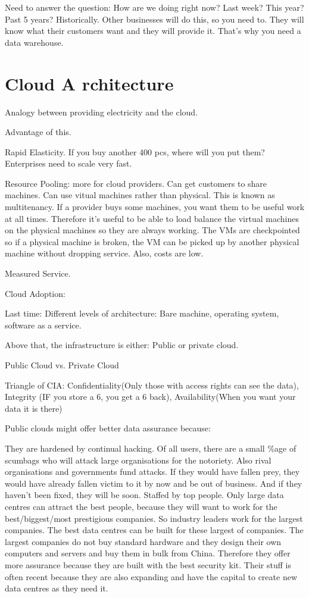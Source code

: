 \documentclass[11pt]{article}
\begin{document}
Need to answer the question: How are we doing right now? Last week? This year? Past 5 years? Historically. Other businesses will do this, so you need to. They will know what their customers want and they will provide it. That’s why you need a data warehouse.



\section{Cloud A rchitecture}

Analogy between providing electricity and the cloud.

Advantage of this.

Rapid Elasticity. If you buy another 400 pcs, where will you put them? Enterprises need to scale very fast.

Resource Pooling: more for cloud providers. Can get customers to share machines. Can use vitual machines rather than physical. This is known as multitenancy. If a provider buys some machines, you want them to be useful work at all times. Therefore it’s useful to be able to load balance the virtual machines on the physical machines so they are always working. The VMs are checkpointed so if a physical machine is broken, the VM can be picked up by another physical machine without dropping service. Also, costs are low.

Measured Service.

Cloud Adoption:

Last time: Different levels of architecture: Bare machine, operating system, software as a service.

Above that, the infrastructure is either: Public or private cloud.

Public Cloud vs. Private Cloud

Triangle of CIA: Confidentiality(Only those with access rights can see the data), Integrity (IF you store a 6, you get a 6 back), Availability(When you want your data it is there)

Public clouds might offer better data assurance because:

They are hardened by continual hacking. Of all users, there are a small \%age of scumbags who will attack large organisations for the notoriety. Also rival organisations and governments fund attacks. If they would have fallen prey, they would have already fallen victim to it by now and be out of business. And if they haven’t been fixed, they will be soon.
Staffed by top people. Only large data centres can attract the best people, because they will want to work for the best/biggest/most prestigious companies. So industry leaders work for the largest companies.
The best data centres can be built for these largest of companies. The largest companies do not buy standard hardware and they design their own computers and servers and buy them in bulk from China. Therefore they offer more assurance because they are built with the best security kit. Their stuff is often recent because they are also expanding and have the capital to create new data centres as they need it.
\end{document}
